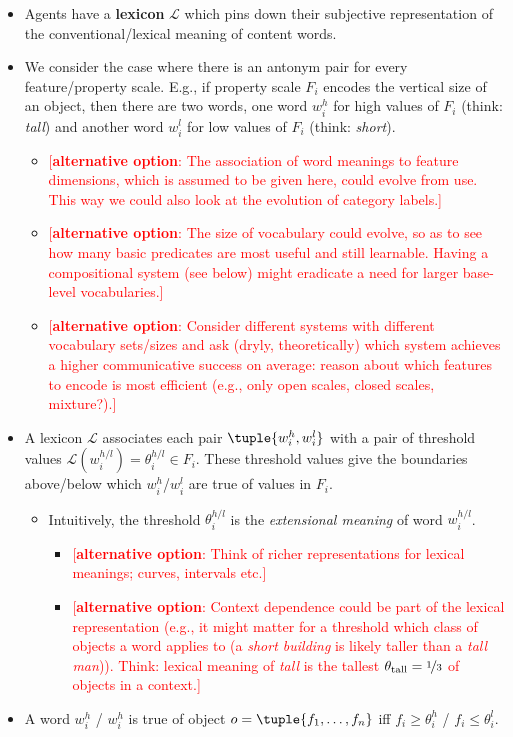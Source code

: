 \documentclass[fleqn,reqno,12pt]{article}
\newcommand{\optional}[1]{\textcolor{Red}{[\textbf{alternative option}: #1]}}
\newcommand{\word}{\ensuremath{w}}
\begin{document}
\begin{itemize}
\item Agents have a \textbf{lexicon} $\mathcal{L}$ which pins down their subjective
  representation of the conventional/lexical meaning of content words.
\item We consider the case where there is an antonym pair for every feature/property
  scale. E.g., if property scale $F_i$ encodes the vertical size of an object, then there are
  two words, one word $\word_i^h$ for high values of $F_i$ (think: \emph{tall}) and
  another word $\word_i^l$ for low values of $F_i$ (think: \emph{short}).
  \begin{itemize}
  \item \optional{The association of word meanings to feature dimensions, which is assumed to
      be given here, could evolve from use. This way we could also look at the evolution of
      category labels.}
  \item \optional{The size of vocabulary could evolve, so as to see how many basic predicates
      are most useful and still learnable. Having a compositional system (see below) might
      eradicate a need for larger base-level vocabularies.}
  \item \optional{Consider different systems with different vocabulary sets/sizes and ask
      (dryly, theoretically) which system achieves a higher communicative success on average:
      reason about which features to encode is most efficient (e.g., only open scales, closed
      scales, mixture?).}
  \end{itemize}
\item A lexicon $\mathcal{L}$ associates each pair $\tuple{\word_i^h,\word_i^l}$ with a pair
  of threshold values $\mathcal{L}(\word_i^{h/l}) = \theta_i^{h/l} \in F_i$. These threshold
  values give the boundaries above/below which $\word_i^h$/$\word_i^l$ are true of values in
  $F_i$.
  \begin{itemize}
  \item Intuitively, the threshold $\theta_i^{h/l}$ is the \emph{extensional meaning} of word
    $\word_i^{h/l}$.
    \begin{itemize}
    \item \optional{Think of richer representations for lexical meanings; curves, intervals
        etc.}
    \item \optional{Context dependence could be part of the lexical representation (e.g., it might
        matter for a threshold which class of objects a word applies to (a \emph{short building}
        is likely taller than a \emph{tall man})). Think: lexical meaning of \emph{tall} is the
      tallest $\theta_{\text{tall}} = \nicefrac{1}{3}$ of objects in a context.}
    \end{itemize}
  \end{itemize}
\item A word $\word_i^{h}$ / $\word_i^{h}$ is true of object $o = \tuple{f_1, \dots, f_n}$ iff
  $f_i \ge \theta_i^h$ / $f_i \le \theta_i^l$.
\end{itemize}
\end{document}
